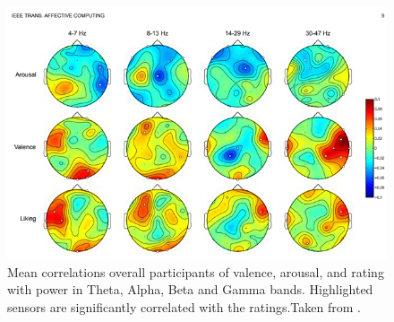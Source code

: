 \begin{figure}[h!]
\includegraphics[width=12cm]{img/related_work/koelstra_topomaps.png}
\centering
\caption{Mean correlations overall participants of valence, arousal, and rating with power in Theta, Alpha, Beta and Gamma bands. Highlighted sensors are significantly correlated with the ratings.Taken from \cite{koelstra_deap_2012}.}\label{fig_koelstra_topomaps}
\end{figure}

